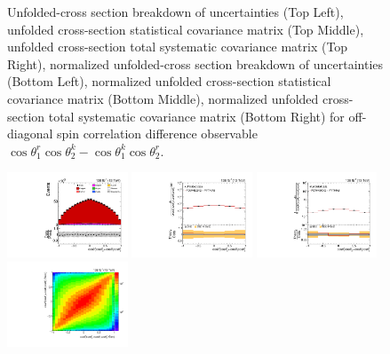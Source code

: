\begin{figure}[htb]
\begin{center}
\caption{Unfolded-cross section breakdown of uncertainties (Top Left), unfolded cross-section statistical covariance matrix (Top Middle), unfolded cross-section total systematic covariance matrix (Top Right), normalized unfolded-cross section breakdown of uncertainties (Bottom Left), normalized unfolded cross-section statistical covariance matrix (Bottom Middle), normalized unfolded cross-section total systematic covariance matrix (Bottom Right) for off-diagonal spin correlation difference observable $\cos\theta_{1}^{r}\cos\theta_{2}^{k}-\cos\theta_{1}^{k}\cos\theta_{2}^{r}$.}
\label{fig:c_Mrk_uncertainties}
\end{center}
\end{figure}
\clearpage
\begin{figure}[htb]
\begin{center}
 \includegraphics[width=0.32\textwidth]{fig_fullRun2UL/controlplots/combined/Hyp_LLBarCPnr.pdf}
 \includegraphics[width=0.32\textwidth]{fig_fullRun2UL/unfolding/combined/UnfoldedResults_c_Pnr.pdf}
 \includegraphics[width=0.32\textwidth]{fig_fullRun2UL/unfolding/combined/UnfoldedResultsNorm_c_Pnr.pdf} \\
 \includegraphics[width=0.32\textwidth]{fig_fullRun2UL/unfolding/combined/ResponseMatrix_c_Pnr.pdf}

\end{center}
\end{figure}
